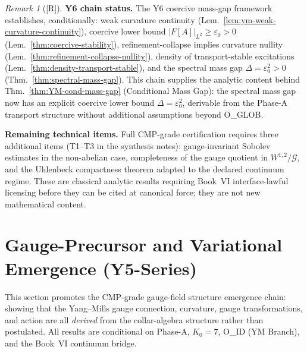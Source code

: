 \documentclass[12pt,oneside]{amsbook}
\theoremstyle{plain}
\theoremstyle{definition}
\theoremstyle{remark}
\newtheorem{remark}[theorem]{Remark}
\newcommand{\status}[1]{\textup{[#1]}}
\begin{document}
\begin{remark}[\status{R}]\label{rem:y6-status}
\textbf{Y6 chain status.}
The Y6 coercive mass-gap framework establishes, conditionally:
weak curvature continuity (Lem.~\ref{lem:ym-weak-curvature-continuity}),
coercive lower bound
$|F[A]|_{L^2} \geq \varepsilon_0 > 0$
(Lem.~\ref{thm:coercive-stability}),
refinement-collapse implies curvature nullity
(Lem.~\ref{thm:refinement-collapse-nullity}),
density of transport-stable excitations
(Lem.~\ref{thm:density-transport-stable}),
and the spectral mass gap $\Delta = \varepsilon_0^2 > 0$
(Thm.~\ref{thm:spectral-mass-gap}).
This chain supplies the analytic content behind
Thm.~\ref{thm:YM-cond-mass-gap} (Conditional Mass Gap):
the spectral mass gap now has an explicit coercive lower bound
$\Delta = \varepsilon_0^2$, derivable from the Phase-A transport
structure without additional assumptions beyond O\_GLOB.

\textbf{Remaining technical items.}
Full CMP-grade certification requires three additional items
(T1--T3 in the synthesis notes):
gauge-invariant Sobolev estimates in the non-abelian case,
completeness of the gauge quotient in $W^{1,2}/\mathcal{G}$,
and the Uhlenbeck compactness theorem adapted to the declared
continuum regime. These are classical analytic results requiring
Book~VI interface-lawful licensing before they can be cited at
canonical force; they are not new mathematical content.
\end{remark}

\section{Gauge-Precursor and Variational Emergence (Y5-Series)}
\label{sec:ym-y5-gauge}

This section promotes the CMP-grade gauge-field structure emergence
chain: showing that the Yang--Mills gauge connection, curvature,
gauge transformations, and action are all \emph{derived} from the
collar-algebra structure rather than postulated. All results are
conditional on Phase-A, $K_0=7$, O\_ID (YM Branch), and
the Book~VI continuum bridge.
\end{document}
